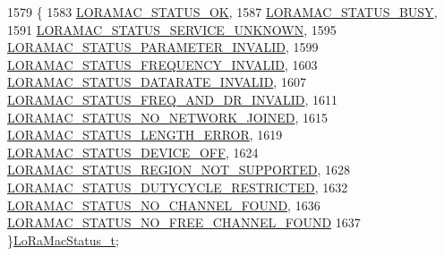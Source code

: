 \begin{DoxyCode}
1579 \{
1583     \mbox{\hyperlink{group___l_o_r_a_m_a_c_gga1d18f26b344040b3ec5c3db662919661a03db5fca052313edb3823c014b653a74}{LORAMAC\_STATUS\_OK}},
1587     \mbox{\hyperlink{group___l_o_r_a_m_a_c_gga1d18f26b344040b3ec5c3db662919661a66b12f569207eacd97ee1c1d6c4cee6d}{LORAMAC\_STATUS\_BUSY}},
1591     \mbox{\hyperlink{group___l_o_r_a_m_a_c_gga1d18f26b344040b3ec5c3db662919661aff502a87db22d6a9a4919e4b54c7c1cf}{LORAMAC\_STATUS\_SERVICE\_UNKNOWN}},
1595     \mbox{\hyperlink{group___l_o_r_a_m_a_c_gga1d18f26b344040b3ec5c3db662919661ad0d3119f247d00e1787dda106fcb3017}{LORAMAC\_STATUS\_PARAMETER\_INVALID}},
1599     \mbox{\hyperlink{group___l_o_r_a_m_a_c_gga1d18f26b344040b3ec5c3db662919661ae3ea7b89796aed5a320013d9743b2955}{LORAMAC\_STATUS\_FREQUENCY\_INVALID}},
1603     \mbox{\hyperlink{group___l_o_r_a_m_a_c_gga1d18f26b344040b3ec5c3db662919661aa910e51ef7a7cf64c27dd3ffe5eb9d38}{LORAMAC\_STATUS\_DATARATE\_INVALID}},
1607     \mbox{\hyperlink{group___l_o_r_a_m_a_c_gga1d18f26b344040b3ec5c3db662919661a163a1a739baee13607068af42f2e9d30}{LORAMAC\_STATUS\_FREQ\_AND\_DR\_INVALID}},
1611     \mbox{\hyperlink{group___l_o_r_a_m_a_c_gga1d18f26b344040b3ec5c3db662919661a105228330376111d46d99d57688a20ae}{LORAMAC\_STATUS\_NO\_NETWORK\_JOINED}},
1615     \mbox{\hyperlink{group___l_o_r_a_m_a_c_gga1d18f26b344040b3ec5c3db662919661a4ab40311dcd2eeffc77f573a919b29b1}{LORAMAC\_STATUS\_LENGTH\_ERROR}},
1619     \mbox{\hyperlink{group___l_o_r_a_m_a_c_gga1d18f26b344040b3ec5c3db662919661aff1d3a91250809d1770a74776057b8ce}{LORAMAC\_STATUS\_DEVICE\_OFF}},
1624     \mbox{\hyperlink{group___l_o_r_a_m_a_c_gga1d18f26b344040b3ec5c3db662919661af424839424174be5fc5e52e00160940e}{LORAMAC\_STATUS\_REGION\_NOT\_SUPPORTED}},
1628     \mbox{\hyperlink{group___l_o_r_a_m_a_c_gga1d18f26b344040b3ec5c3db662919661a0c982ada0769ecee2e1041fb6945ddd4}{LORAMAC\_STATUS\_DUTYCYCLE\_RESTRICTED}},
1632     \mbox{\hyperlink{group___l_o_r_a_m_a_c_gga1d18f26b344040b3ec5c3db662919661a393266a9952cf6617917f1fce181efcd}{LORAMAC\_STATUS\_NO\_CHANNEL\_FOUND}},
1636     \mbox{\hyperlink{group___l_o_r_a_m_a_c_gga1d18f26b344040b3ec5c3db662919661a61b018814bb071d16d3f970f907fafb2}{LORAMAC\_STATUS\_NO\_FREE\_CHANNEL\_FOUND}}
1637 \}\mbox{\hyperlink{group___l_o_r_a_m_a_c_ga30bd25657e10480f8605ee951b0ecfbd}{LoRaMacStatus\_t}};
\end{DoxyCode}
\mbox{\label{group___l_o_r_a_m_a_c_ga7b080a046606f23fe030d0aa6d2a0e30}} 
